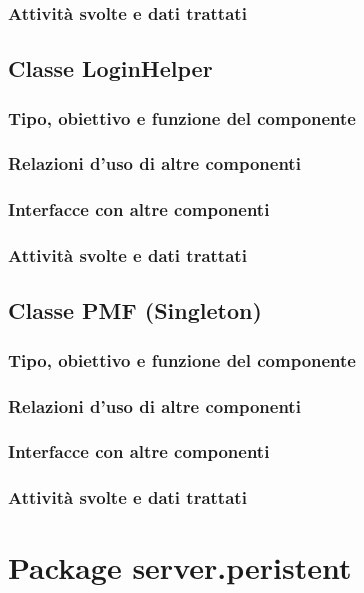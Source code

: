 \subsubsection*{Attivit\`a svolte e dati trattati}

\subsection{Classe LoginHelper}
\subsubsection*{Tipo, obiettivo e funzione del componente}
\subsubsection*{Relazioni d'uso di altre componenti}
\subsubsection*{Interfacce con altre componenti}
\subsubsection*{Attivit\`a svolte e dati trattati}

\newpage
\subsection{Classe PMF (Singleton)}
\subsubsection*{Tipo, obiettivo e funzione del componente}
\subsubsection*{Relazioni d'uso di altre componenti}
\subsubsection*{Interfacce con altre componenti}
\subsubsection*{Attivit\`a svolte e dati trattati}

\section{Package server.peristent} %

